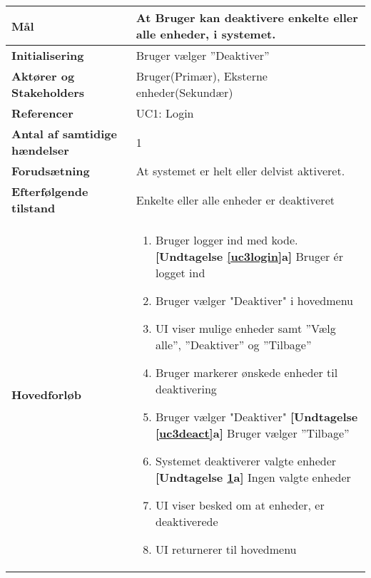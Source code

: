\begin{table}[H] \centering
	\label{tab:UC3}
\begin{tabular}{|p{6cm}|p{8cm}|}
	\hline
		\textbf{Mål}						&At Bruger kan deaktivere enkelte eller alle enheder, i systemet. \\\hline
		\textbf{Initialisering} 			&Bruger vælger ''Deaktiver'' \\ \hline
		\textbf{Aktører og Stakeholders}	&Bruger(Primær), Eksterne enheder(Sekundær)\\ \hline
		\textbf{Referencer} 				&UC1: Login \\ \hline
		\textbf{Antal af samtidige hændelser} &1 \\ \hline
		\textbf{Forudsætning} 			&At systemet er helt eller delvist aktiveret.\\ \hline
		\textbf{Efterfølgende tilstand} 	&Enkelte eller alle enheder er deaktiveret \\ \hline
		\textbf{Hovedforløb}				&

	\begin{enumerate}	
	
				\item \label{uc3login} Bruger logger ind med kode. \newline
					\textbf{[Undtagelse \ref{uc3login}a]} Bruger ér logget ind					
					
				\item Bruger vælger "Deaktiver" i hovedmenu
										
				\item \label{uc3menu}UI viser mulige enheder samt ''Vælg alle'', ''Deaktiver''  og ''Tilbage''
												
				\item Bruger markerer ønskede enheder til deaktivering
												
				\item \label{uc3deact} Bruger vælger "Deaktiver"\newline
					\textbf{[Undtagelse \ref{uc3deact}a]} Bruger vælger ''Tilbage''
												
				\item \label{uc3sysdeact} Systemet deaktiverer valgte enheder \newline
					\textbf{[Undtagelse \ref{uc3sysdeact}a]} Ingen valgte enheder
				
				\item UI viser besked om at enheder, er deaktiverede
																	
				\item UI returnerer til hovedmenu	
	

\end{enumerate}
\end{tabular}
\end{table}
